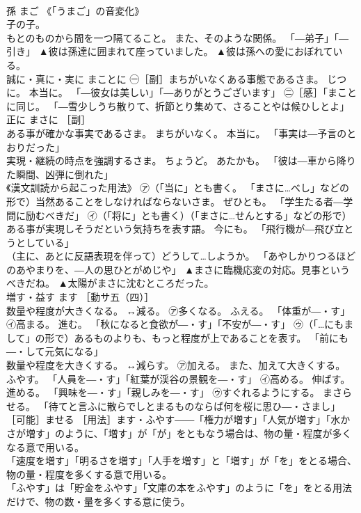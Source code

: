 \documentclass[8pt]{extreport}
\begin{document}
\begin{CJK}{UTF8}{min}
\\	孫	まご	《「うまご」の音変化》 
\\	子の子。 
\\	もとのものから間を一つ隔てること。 また、そのような関係。 「―弟子」「―引き」	▲彼は孫達に囲まれて座っていました。 ▲彼は孫への愛におぼれている。
\\	誠に・真に・実に	まことに	㊀［副］まちがいなくある事態であるさま。 じつに。 本当に。 「―彼女は美しい」「―ありがとうございます」 ㊁［感］「まこと 
\\	に同じ。 「―雪少しうち散りて、折節とり集めて、さることやは候ひしとよ」	
\\	正に	まさに	［副］ 
\\	ある事が確かな事実であるさま。 まちがいなく。 本当に。 「事実は―予言のとおりだった」 
\\	実現・継続の時点を強調するさま。 ちょうど。 あたかも。 「彼は―車から降りた瞬間、凶弾に倒れた」 
\\	《漢文訓読から起こった用法》 ㋐（「当に」とも書く。 「まさに…べし」などの形で）当然あることをしなければならないさま。 ぜひとも。 「学生たる者―学問に励むべきだ」 ㋑（「将に」とも書く）（「まさに…せんとする」などの形で）ある事が実現しそうだという気持ちを表す語。 今にも。 「飛行機が―飛び立とうとしている」 
\\	（主に、あとに反語表現を伴って）どうして…しようか。 「あやしかりつるほどのあやまりを、―人の思ひとがめじや」	▲まさに臨機応変の対応。見事というべきだね。 ▲太陽がまさに沈むところだった。
\\	増す・益す	ます	［動サ五（四）］ 
\\	数量や程度が大きくなる。 ↔減る。 ㋐多くなる。 ふえる。 「体重が―・す」 ㋑高まる。 進む。 「秋になると食欲が―・す」「不安が―・す」 ㋒（「…にもまして」の形で）あるものよりも、もっと程度が上であることを表す。 「前にも―・して元気になる」 
\\	数量や程度を大きくする。 ↔減らす。 ㋐加える。 また、加えて大きくする。 ふやす。 「人員を―・す」「紅葉が渓谷の景観を―・す」 ㋑高める。 伸ばす。 進める。 「興味を―・す」「親しみを―・す」 ㋒すぐれるようにする。 まさらせる。 「待てと言ふに散らでしとまるものならば何を桜に思ひ―・さまし」 ［可能］ませる ［用法］ます・ふやす――「権力が増す」「人気が増す」「水かさが増す」のように、「増す」が「が」をともなう場合は、物の量・程度が多くなる意で用いる。 
\\	「速度を増す」「明るさを増す」「人手を増す」と「増す」が「を」をとる場合、物の量・程度を多くする意で用いる。 
\\	「ふやす」は「貯金をふやす」「文庫の本をふやす」のように「を」をとる用法だけで、物の数・量を多くする意に使う。 

\end{CJK}
\end{document}
